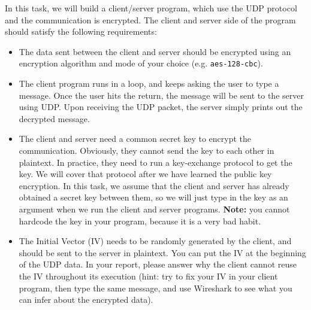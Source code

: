 In this task, we will build a client/server program, which use the UDP protocol and
the communication is encrypted. The client and server side of the program should 
satisfy the following requirements:

\begin{itemize}
  \item The data sent between the client and server should be encrypted using 
    an encryption algorithm and mode of your choice (e.g. \texttt{aes-128-cbc}).

  \item The client program runs in a loop, and keeps asking the user to type a message. 
    Once the user hits the return, the message will be sent to the server using UDP. 
    Upon receiving the UDP packet, the server simply prints out the decrypted message. 

  \item The client and server need a common secret key to encrypt the communication.
    Obviously, they cannot send the key to each other in plaintext. In practice, they 
    need to run a key-exchange protocol to get the key. We will cover that protocol
    after we have learned the public key encryption. In this task, we assume that the client
    and server has already obtained a secret key between them, so we will just    
    type in the key as an argument when we run the client and server programs. 
    {\bf Note:} you cannot hardcode the key in your program, because it is a very bad habit.

  \item The Initial Vector (IV) needs to be randomly generated by the client, 
    and should be sent to the server in plaintext. You can put the IV at the beginning of the
    UDP data. In your report, please answer why the client cannot reuse the IV throughout its
    execution (hint: try to fix your IV in your client program, then type the same message, and
    use Wireshark to see what you can infer about the encrypted data). 
\end{itemize}


